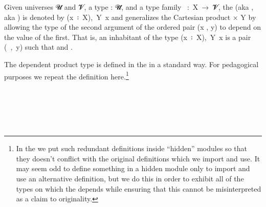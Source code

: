 Given universes \ab 𝓤 and \ab 𝓥, a type  \as : \ab 𝓤\af ̇, and a type family ~\as :~\ab X~\as →~\ab 𝓥\af ̇, the  (aka , aka ) is denoted by (\ab x~\af ꞉~\ab X),~\ab Y~\ab x and generalizes the Cartesian product  \af × \ab Y by allowing the type  of the second argument of the ordered pair (\ab x \af , \ab y) to depend on the value  of the first. That is, an inhabitant of the type (\ab x~\af ꞉~\ab X),~\ab Y~\ab x is a pair (~\af ,~\ab y) such that  and .

The dependent product type is defined in the \typetopology in a standard way. For pedagogical purposes we repeat the definition here.\footnote{In the \ualib we put such redundant definitions inside ``hidden'' modules so that they doesn't conflict with the original definitions which we import and use. It may seem odd to define something in a hidden module only to import and use an alternative definition, but we do this in order to exhibit all of the types on which the \ualib depends while ensuring that this cannot be misinterpreted as a claim to originality.}
\ccpad
\begin{code}%
\>[1]\AgdaSpace{}%
\AgdaSpace{}%
\AgdaSymbol{\{}\AgdaSpace{}%
\AgdaSymbol{\}}\AgdaSpace{}%
\AgdaSymbol{\{}\AgdaSpace{}%
\AgdaSymbol{:}\AgdaSpace{}%
\AgdaSpace{}%
\AgdaSpace{}%
\AgdaSymbol{\}}\AgdaSpace{}%
\AgdaSymbol{(}\AgdaSpace{}%
\AgdaSymbol{:}\AgdaSpace{}%
\AgdaSpace{}%
\AgdaSpace{}%
\AgdaSpace{}%
\AgdaSpace{}%
\AgdaSymbol{)}\AgdaSpace{}%
\AgdaSymbol{:}\AgdaSpace{}%
\AgdaSpace{}%
\AgdaSpace{}%
\AgdaSpace{}%
%
\>[53]\<%
\\
\>[1][@{}l@{\AgdaIndent{0}}]%
\>[2]\AgdaSpace{}%
\AgdaOperator{\AgdaInductiveConstructor{\AgdaUnderscore{},\AgdaUnderscore{}}}\<%
\\
%
\>[2]\<%
\\
\>[2][@{}l@{\AgdaIndent{0}}]%
\>[3]\AgdaSpace{}%
\AgdaSymbol{:}\AgdaSpace{}%
\<%
\\
%
\>[3]\AgdaSpace{}%
\AgdaSymbol{:}\AgdaSpace{}%
\AgdaSpace{}%
\<%
\end{code}
